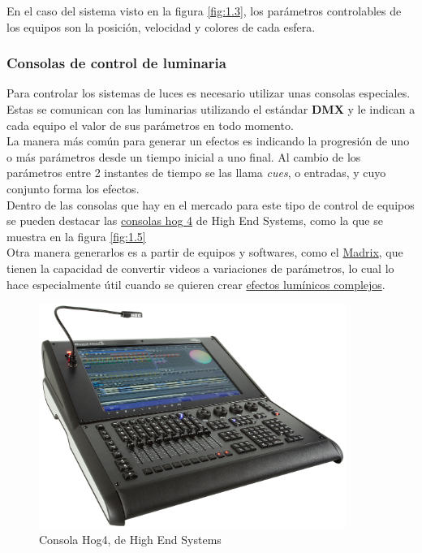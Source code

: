 En el caso del sistema visto en la figura \ref{fig:1.3}, los parámetros controlables de los equipos son la posición, velocidad y colores de cada esfera.

\subsubsection{Consolas de control de luminaria}
Para controlar los sistemas de luces es necesario utilizar unas consolas especiales. Estas se comunican con las luminarias utilizando el estándar \textbf{DMX} y le indican a cada equipo el valor de sus parámetros en todo momento. \\

La manera más común para generar un efectos es indicando la progresión de uno o más parámetros desde un tiempo inicial a uno final. Al cambio de los parámetros entre 2 instantes de tiempo se las llama \textit{cues}, o entradas, y cuyo conjunto forma los efectos. \\
Dentro de las consolas que hay en el mercado para este tipo de control de equipos se pueden destacar las \href{https://www.highend.com/products/consoles}{consolas hog 4} de High End Systems, como la que se muestra en la figura \ref{fig:1.5}\\

Otra manera generarlos es a partir de equipos y softwares, como el \href{https://www.madrix.com/}{Madrix}, que tienen la capacidad de convertir videos a variaciones de parámetros, lo cual lo hace especialmente útil cuando se quieren crear \href{https://www.youtube.com/watch?v=mdbl5ks7Nu0}{efectos lumínicos complejos}.


\begin{figure}[!ht]
	\centering
	\includegraphics[width=10cm,scale=1]{resources/1_5-consolaHOG.png}
	\caption{Consola Hog4, de High End Systems}
	\label{fig:\thefigure}
\end{figure}

